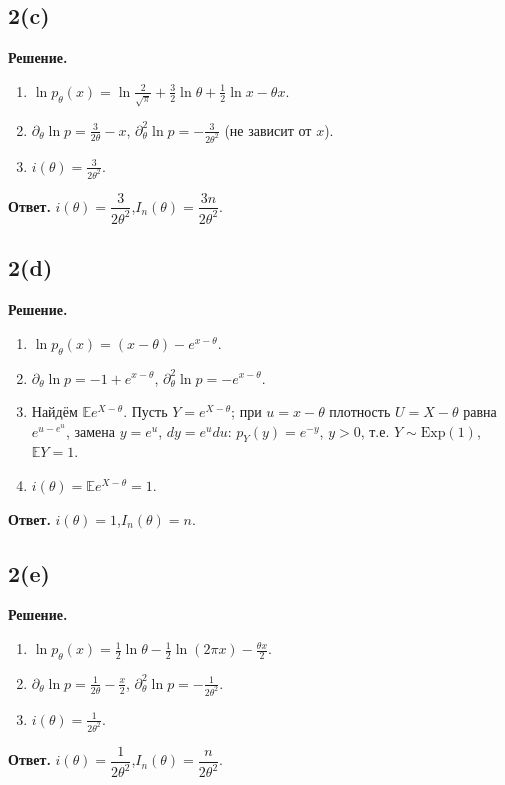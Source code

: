 \documentclass[12pt,a4paper]{article}
\newcommand{\E}{\mathbb{E}}
\newcommand{\sol}{\par\noindent\textbf{Решение.} }
\newcommand{\ans}{\par\smallskip\noindent\textbf{Ответ.} }
\begin{document}
\subsection*{2(c)}
\sol
\begin{enumerate}
  \item $\ln p_\theta(x)=\ln\frac2{\sqrt\pi}+\frac32\ln\theta+\frac12\ln x-\theta x$.
  \item $\partial_\theta\ln p=\frac{3}{2\theta}-x$,\quad
        $\partial^2_\theta\ln p=-\frac{3}{2\theta^2}$ (не зависит от $x$).
  \item $i(\theta)=\frac3{2\theta^2}$.
\end{enumerate}
\ans $i(\theta)=\dfrac{3}{2\theta^2}$,\quad $I_n(\theta)=\dfrac{3n}{2\theta^2}$.

\subsection*{2(d)}
\sol
\begin{enumerate}
  \item $\ln p_\theta(x)=(x-\theta)-e^{x-\theta}$.
  \item $\partial_\theta\ln p=-1+e^{x-\theta}$,\quad
        $\partial^2_\theta\ln p=-e^{x-\theta}$.
  \item Найдём $\E e^{X-\theta}$. Пусть $Y=e^{X-\theta}$; при $u=x-\theta$
        плотность $U=X-\theta$ равна $e^{u-e^u}$, замена $y=e^u$, $dy=e^u du$:
        $p_Y(y)=e^{-y}$, $y>0$, т.е. $Y\sim\mathrm{Exp}(1)$, $\E Y=1$.
  \item $i(\theta)=\E e^{X-\theta}=1$.
\end{enumerate}
\ans $i(\theta)=1$,\quad $I_n(\theta)=n$.

\subsection*{2(e)}
\sol
\begin{enumerate}
  \item $\ln p_\theta(x)=\frac12\ln\theta-\frac12\ln(2\pi x)-\frac{\theta x}2$.
  \item $\partial_\theta\ln p=\frac1{2\theta}-\frac x2$,\quad
        $\partial^2_\theta\ln p=-\frac1{2\theta^2}$.
  \item $i(\theta)=\frac1{2\theta^2}$.
\end{enumerate}
\ans $i(\theta)=\dfrac{1}{2\theta^2}$,\quad $I_n(\theta)=\dfrac{n}{2\theta^2}$.
\end{document}
